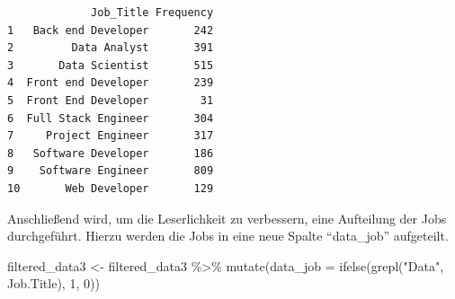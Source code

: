 \documentclass[
  letterpaper,
  DIV=11,
  numbers=noendperiod]{scrartcl}
\newenvironment{Shaded}{\begin{snugshade}}{\end{snugshade}}
\newcommand{\AttributeTok}[1]{\textcolor[rgb]{0.40,0.45,0.13}{#1}}
\newcommand{\ConstantTok}[1]{\textcolor[rgb]{0.56,0.35,0.01}{#1}}
\newcommand{\DecValTok}[1]{\textcolor[rgb]{0.68,0.00,0.00}{#1}}
\newcommand{\FunctionTok}[1]{\textcolor[rgb]{0.28,0.35,0.67}{#1}}
\newcommand{\NormalTok}[1]{\textcolor[rgb]{0.00,0.23,0.31}{#1}}
\newcommand{\OtherTok}[1]{\textcolor[rgb]{0.00,0.23,0.31}{#1}}
\newcommand{\SpecialCharTok}[1]{\textcolor[rgb]{0.37,0.37,0.37}{#1}}
\newcommand{\StringTok}[1]{\textcolor[rgb]{0.13,0.47,0.30}{#1}}
\begin{document}
\begin{Shaded}
\end{Shaded}

\begin{verbatim}
             Job_Title Frequency
1   Back end Developer       242
2         Data Analyst       391
3       Data Scientist       515
4  Front end Developer       239
5  Front End Developer        31
6  Full Stack Engineer       304
7     Project Engineer       317
8   Software Developer       186
9    Software Engineer       809
10       Web Developer       129
\end{verbatim}

Anschließend wird, um die Leserlichkeit zu verbessern, eine Aufteilung
der Jobs durchgeführt. Hierzu werden die Jobs in eine neue Spalte
``data\_job'' aufgeteilt.

\begin{Shaded}
\begin{Highlighting}[]
\NormalTok{filtered\_data3 }\OtherTok{\textless{}{-}}\NormalTok{ filtered\_data3 }\SpecialCharTok{\%\textgreater{}\%}
  \FunctionTok{mutate}\NormalTok{(}\AttributeTok{data\_job =} \FunctionTok{ifelse}\NormalTok{(}\FunctionTok{grepl}\NormalTok{(}\StringTok{"Data"}\NormalTok{, Job.Title), }\DecValTok{1}\NormalTok{, }\DecValTok{0}\NormalTok{))}
\end{Highlighting}
\end{Shaded}

\begin{Shaded}
\end{Shaded}
\end{document}

